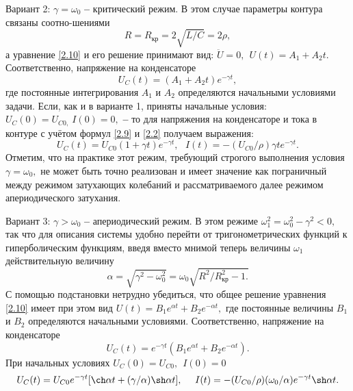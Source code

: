 \textsf{Вариант 2:} $\gamma=\omega_0$ \textbf{--} \textsf{критический режим.} В этом случае параметры контура связаны соотно-шениями
\begin{equation}\label{2.38}
R=R_{\text{кр}}=2\sqrt{L/C}=2\rho,
\end{equation}
а уравнение \eqref{2.10} и его решение принимают вид: $\ddot{U}=0,~~U(t)=A_1+A_2t.$ Соответственно, напряжение на конденсаторе
\begin{equation}\label{2.39}
U_C(t)=(A_1+A_2t)e^{-\gamma t},
\end{equation}
где постоянные интегрирования $A_1$ и $A_2$ определяются начальными условиями задачи. Если, как и в \textsf{варианте 1,} приняты начальные условия: $U_C(0)=U_{C0,}~I(0)=0,$ \textbf{--} то для напряжения на конденсаторе и тока в контуре с учётом формул \eqref{2.9} и \eqref{2.2} получаем выражения:
\begin{equation}\label{2.40}
U_C(t)=U_{C0}(1+\gamma t)e^{-\gamma t},~~~I(t)=-(U_{C0}/\rho)\gamma te^{-\gamma t}.
\end{equation}
Отметим, что на практике этот режим, требующий строгого выполнения условия $\gamma=\omega_0,$ не может быть точно реализован и имеет значение как пограничный между режимом затухающих колебаний и рассматриваемого далее режимом апериодического затухания. 

\textsf{Вариант 3:} $\gamma>\omega_0$ \textbf{--} \textsf{апериодический режим.} В этом режиме $\omega_1^2=\omega_0^2-\gamma^2<0,$ так что для описания системы удобно перейти от тригонометрических функций к гиперболическим функ\-циям, введя вместо мнимой теперь величины $\omega_1$ действительную величину
\begin{equation}\label{2.41}
\alpha=\sqrt{\gamma^2-\omega_0^2}=\omega_0\sqrt{R^2/R_{\text{кр}}^2-1.}
\end{equation}
С помощью подстановки нетрудно убедиться, что общее решение уравнения \eqref{2.10} имеет при этом вид $U(t)=B_1e^{\alpha t}+B_2e^{-\alpha t},$ где постоянные величины $B_1$ и $B_2$ определяются начальными условиями. Соответственно, напряжение на конденсаторе
\begin{equation}\label{2.42}
U_C(t)=e^{-\gamma t}(B_1e^{\alpha t}+B_2e^{-\alpha t}).
\end{equation}
При начальных условиях $U_C(0)=U_{C0},~~I(0)=0$
{\large
\begin{equation}\label{2.43}
U_C(t)=U_{C0}e^{-\gamma t}[\ch \alpha t+(\gamma/\alpha)\sh \alpha t],~~~~
I(t)=-(U_{C0}/\rho)(\omega_0/\alpha)e^{-\gamma t}\sh \alpha t.
\end{equation}}

